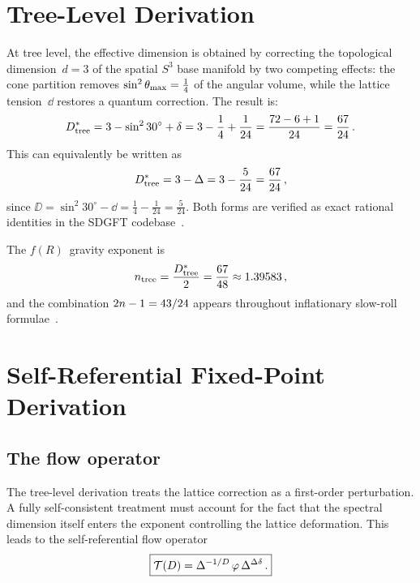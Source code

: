 \documentclass[amsmath,amssymb,aps,prd,twocolumn,superscriptaddress,nofootinbib]{revtex4-2}
\begin{document}
\section{Tree-Level Derivation}
\label{sec:tree}

At tree level, the effective dimension is obtained by correcting the
topological dimension~$d = 3$ of the spatial $S^3$ base manifold by
two competing effects: the cone partition removes
$\sin^2\theta_{\mathrm{max}} = \tfrac{1}{4}$ of the angular volume, while the
lattice tension~$\dd$ restores a quantum correction.  The result is:
\begin{equation}
  D^{*}_{\mathrm{tree}} = 3 - \sin^2 30^\circ + \delta
             = 3 - \frac{1}{4} + \frac{1}{24}
             = \frac{72 - 6 + 1}{24}
             = \frac{67}{24}\,.
  \label{eq:Dstar_tree}
\end{equation}
This can equivalently be written as
\begin{equation}
  D^{*}_{\mathrm{tree}} = 3 - \Delta = 3 - \frac{5}{24} = \frac{67}{24}\,,
  \label{eq:Dstar_tree_alt}
\end{equation}
since $\DD = \sin^2 30^\circ - \dd = \tfrac{1}{4} - \tfrac{1}{24}
= \tfrac{5}{24}$.  Both forms are verified as exact rational
identities in the SDGFT codebase~\cite{Goldstein_Code}.

The $f(R)$~gravity exponent is
\begin{equation}
  n_{\mathrm{tree}} = \frac{D^{*}_{\mathrm{tree}}}{2}
                       = \frac{67}{48} \approx 1.39583\,,
  \label{eq:n_tree}
\end{equation}
and the combination $2n - 1 = 43/24$ appears throughout
inflationary slow-roll formulae~\cite{Goldstein_Paper17}.

\section{Self-Referential Fixed-Point Derivation}
\label{sec:fp}

\subsection{The flow operator}
\label{sec:fp:operator}

The tree-level derivation treats the lattice correction as a
first-order perturbation.  A fully self-consistent treatment must
account for the fact that the spectral dimension itself enters the
exponent controlling the lattice deformation.  This leads to the
self-referential flow operator
\begin{equation}
  \boxed{%
    \Tmap(D) = \DD^{-1/D}\,\gp\,\DD^{\DD\dd}\,.
  }
  \label{eq:T_operator}
\end{equation}
\end{document}
